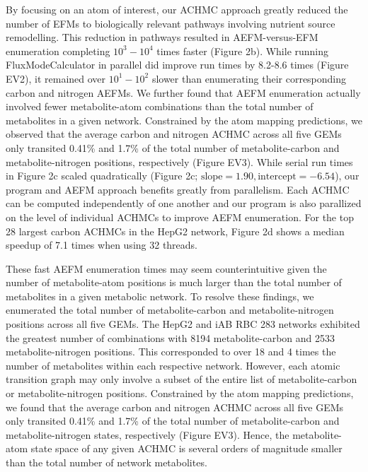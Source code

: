 \documentclass[12pt]{article}
\begin{document}
By focusing on an atom of interest, our ACHMC approach greatly reduced the
number of EFMs to biologically relevant pathways involving nutrient source
remodelling. This reduction in pathways resulted in AEFM-versus-EFM
enumeration completing $10^3-10^4$ times faster (Figure 2b). While running
FluxModeCalculator in parallel did improve run times by 8.2-8.6 times
(Figure EV2), it remained over $10^1-10^2$ slower than enumerating their
corresponding carbon and nitrogen AEFMs. We further found that AEFM
enumeration actually involved fewer metabolite-atom combinations than the
total number of metabolites in a given network. Constrained by the atom
mapping predictions, we observed that the average carbon and nitrogen
ACHMC across all five GEMs only transited 0.41\% and 1.7\% of the total
number of metabolite-carbon and metabolite-nitrogen positions,
respectively (Figure EV3). While serial run times in Figure 2c scaled
quadratically (Figure 2c; $\text{slope}=1.90, \text{intercept}=-6.54$),
our program and AEFM approach benefits greatly from parallelism. Each
ACHMC can be computed independently of one another and our program is also
parallized on the level of individual ACHMCs to improve AEFM enumeration.
For the top 28 largest carbon ACHMCs in the HepG2 network, Figure 2d shows
a median speedup of 7.1 times when using 32 threads. 


\iffalse

These fast AEFM enumeration times may seem counterintuitive given the
number of metabolite-atom positions is much larger than the total number
of metabolites in a given metabolic network. To resolve these findings, we
enumerated the total number of metabolite-carbon and metabolite-nitrogen
positions across all five GEMs. The HepG2 and iAB RBC 283 networks
exhibited the greatest number of combinations with 8194 metabolite-carbon
and 2533 metabolite-nitrogen positions. This corresponded to over 18 and
4 times the number of metabolites within each respective network. However,
  each atomic transition graph may only involve a subset of the entire
  list of metabolite-carbon or metabolite-nitrogen positions. Constrained
  by the atom mapping predictions, we found that the average carbon and
  nitrogen ACHMC across all five GEMs only transited 0.41\% and
1.7\% of the total number of metabolite-carbon and metabolite-nitrogen
states, respectively (Figure EV3). Hence, the metabolite-atom state space
of any given ACHMC is several orders of magnitude smaller than the total
number of network metabolites.
\end{document}
